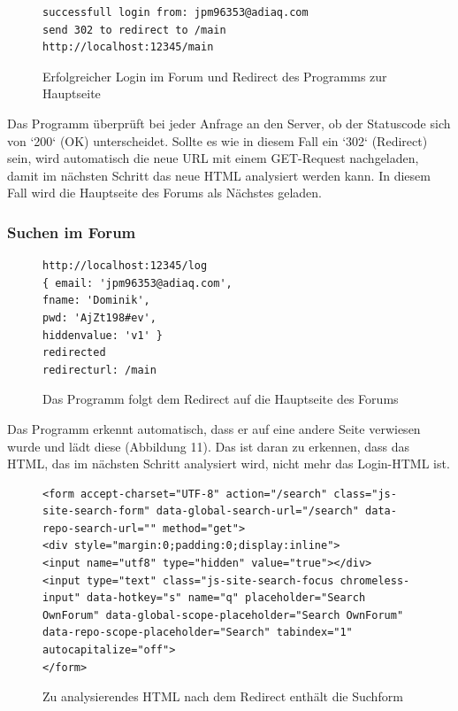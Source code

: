 \begin{figure}[ht]
\begin{lstlisting}[language=HTML5]
successfull login from: jpm96353@adiaq.com
send 302 to redirect to /main
http://localhost:12345/main
\end{lstlisting}
\caption{Erfolgreicher Login im Forum und Redirect des Programms zur Hauptseite}
\end{figure}

Das Programm überprüft bei jeder Anfrage an den Server, ob der Statuscode sich von `200` (OK) unterscheidet. Sollte es wie in diesem Fall ein `302` (Redirect) sein, wird automatisch die neue URL mit einem GET-Request nachgeladen, damit im nächsten Schritt das neue HTML analysiert werden kann. In diesem Fall wird die Hauptseite des Forums als Nächstes geladen.
\newpage

\subsubsection{Suchen im Forum}

\begin{figure}[ht]
\begin{lstlisting}[language=HTML5]
http://localhost:12345/log
{ email: 'jpm96353@adiaq.com',
fname: 'Dominik',
pwd: 'AjZt198#ev',
hiddenvalue: 'v1' }
redirected
redirecturl: /main
\end{lstlisting}
\caption{Das Programm folgt dem Redirect auf die Hauptseite des Forums}
\end{figure}

Das Programm erkennt automatisch, dass er auf eine andere Seite verwiesen wurde und lädt diese (Abbildung 11). Das ist daran zu erkennen, dass das HTML, das im nächsten Schritt analysiert wird, nicht mehr das Login-HTML ist.

\begin{figure}[h!]
\begin{lstlisting}[language=HTML5]
<form accept-charset="UTF-8" action="/search" class="js-site-search-form" data-global-search-url="/search" data-repo-search-url="" method="get">
<div style="margin:0;padding:0;display:inline">
<input name="utf8" type="hidden" value="true"></div>
<input type="text" class="js-site-search-focus chromeless-input" data-hotkey="s" name="q" placeholder="Search OwnForum" data-global-scope-placeholder="Search OwnForum" data-repo-scope-placeholder="Search" tabindex="1" autocapitalize="off">
</form>
\end{lstlisting}
\caption{Zu analysierendes HTML nach dem Redirect enthält die Suchform}
\end{figure}

